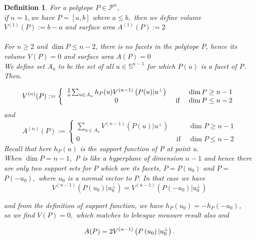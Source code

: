 \documentclass[oneside]{book}
\newtheorem{mydef}{Definition}[section]
\begin{document}
	\begin{mydef} \label{14}
		For a polytope $P \in \mathcal{P}^{n}$,\\
		if  $n=1,$we have  $P=[a, b]$ where $a \leq b,$ then we define volume $V^{(1)}(P):=b-a$ and  surface area $A^{(1)}(P):=2$ 
		\\\\
		For  $ n \geq 2  $ and $\operatorname{dim} P \leq n-2$, there is no facets in the polytope $P$, hence its volume $V(P)=0$ and surface area $A(P)=0$ \\
		
		We define set $A_{{u}}$ to be the set of all $u \in \mathbb{S}^{n-1}$ for which $P(u)$ is a facet of P. Then. 
		
		\begin{equation}
		\label{eq43}
		V^{(n)}(P):=\left\{\begin{array}{ccc}
		\frac{1}{n} $$ \sum_{u \in A_{u}} h_{P}(u) V^{(n-1)}\left(P(u) | u^{\perp}\right) & & \operatorname{dim} P \geq n-1 \\
		0 & \text { if } & \operatorname{dim} P \leq n-2
		\end{array}\right.
		\end{equation}
		and
		\begin{equation}
		\label{eq44}
		A^{(n)}(P):=\left\{\begin{array}{ccc}
		\sum_{u \in A_{u}} V^{(n-1)}\left(P(u) | u^{\perp}\right) & & \operatorname{dim} P \geq n-1 \\
		0 & \text { if } & \operatorname{dim} P \leq n-2
		\end{array}\right.
		\end{equation}
		Recall that here $h_{P}(u)$ is the support function of P at point u. \\
		When $\operatorname{dim} P=n-1, $ P is like a hyperplane of dimension $n - 1$  and hence there are only two support sets for $P$ which are its facets, $P=P\left(u_{0}\right)$ and $P=$ $P\left(-u_{0}\right),$ where $u_{0}$ is a normal vector to $P .$ In that case we have $$V^{(n-1)}\left(P\left(u_{0}\right) | u_{0}^{\perp}\right)=V^{(n-1)}\left(P\left(-u_{0}\right) | u_{0}^{\perp}\right)$$
		
		and from the  definition of support function, we have $h_{P}\left(u_{0}\right)=-h_{P}\left(-u_{0}\right)$,\\ so we find $V(P)=0,$ which matches to lebesgue measure result also  and 
		
		\begin{equation}
		\label{eq45}
		A(P)=2 V^{(n-1)}\left(P\left(u_{0}\right) | u_{0}^{\perp}\right).\\\\
		\end{equation}
	\end{mydef} 
\end{document}
